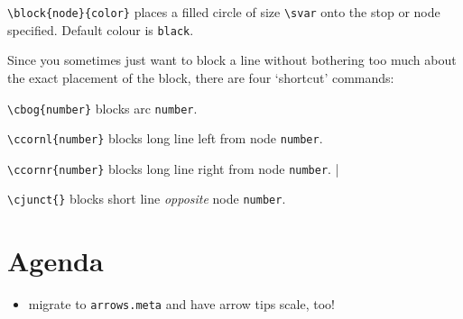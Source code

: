 \documentclass[a5paper]{scrartcl}
\begin{document}
\verb|\block{node}{color}| places a filled circle of size \verb|\svar| onto the stop or node specified. Default colour is \verb|black|.

Since you sometimes just want to block a line without bothering too much about the exact placement of the block, there are four `shortcut' commands:

\verb|\cbog{number}| blocks arc \verb|number|.

\verb|\ccornl{number}| blocks long line left from node  \verb|number|.

\verb|\ccornr{number}| blocks long line right from node  \verb|number|.
|

\verb|\cjunct{}| blocks short line \emph{opposite} node  \verb|number|.

\section*{Agenda}
\begin{itemize}
    \item migrate to \verb|arrows.meta| and have arrow tips scale, too!
\end{itemize}
\end{document}
